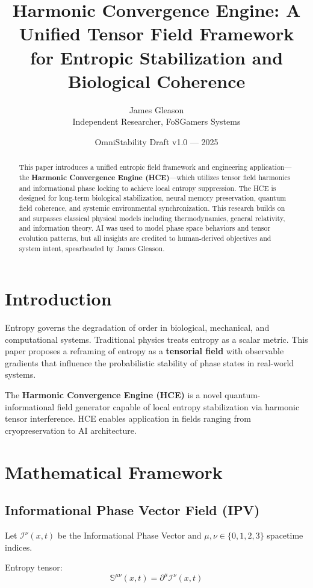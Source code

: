 \documentclass[12pt]{article}
\title{\textbf{Harmonic Convergence Engine: A Unified Tensor Field Framework for Entropic Stabilization and Biological Coherence}}
\author{James Gleason \\ Independent Researcher, FoSGamers Systems}
\date{OmniStability Draft v1.0 — 2025}
\begin{document}
\maketitle

\begin{abstract}
This paper introduces a unified entropic field framework and engineering application—the \textbf{Harmonic Convergence Engine (HCE)}—which utilizes tensor field harmonics and informational phase locking to achieve local entropy suppression. The HCE is designed for long-term biological stabilization, neural memory preservation, quantum field coherence, and systemic environmental synchronization. This research builds on and surpasses classical physical models including thermodynamics, general relativity, and information theory. AI was used to model phase space behaviors and tensor evolution patterns, but all insights are credited to human-derived objectives and system intent, spearheaded by James Gleason.
\end{abstract}

\section{Introduction}
Entropy governs the degradation of order in biological, mechanical, and computational systems. Traditional physics treats entropy as a scalar metric. This paper proposes a reframing of entropy as a \textbf{tensorial field} with observable gradients that influence the probabilistic stability of phase states in real-world systems.

The \textbf{Harmonic Convergence Engine (HCE)} is a novel quantum-informational field generator capable of local entropy stabilization via harmonic tensor interference. HCE enables application in fields ranging from cryopreservation to AI architecture.

\section{Mathematical Framework}

\subsection{Informational Phase Vector Field (IPV)}
Let $\mathcal{I}^\nu(x, t)$ be the Informational Phase Vector and $\mu, \nu \in \{0,1,2,3\}$ spacetime indices.

Entropy tensor:
\[
\mathbb{S}^{\mu\nu}(x, t) = \partial^\mu \mathcal{I}^\nu(x, t)
\]
\end{document}
